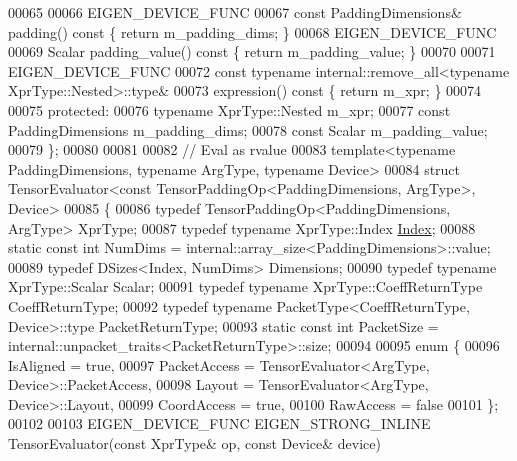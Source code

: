 \begin{DoxyCode}
00065 
00066     EIGEN\_DEVICE\_FUNC
00067     \textcolor{keyword}{const} PaddingDimensions& padding()\textcolor{keyword}{ const }\{ \textcolor{keywordflow}{return} m\_padding\_dims; \}
00068     EIGEN\_DEVICE\_FUNC
00069     Scalar padding\_value()\textcolor{keyword}{ const }\{ \textcolor{keywordflow}{return} m\_padding\_value; \}
00070 
00071     EIGEN\_DEVICE\_FUNC
00072     \textcolor{keyword}{const} \textcolor{keyword}{typename} internal::remove\_all<typename XprType::Nested>::type&
00073     expression()\textcolor{keyword}{ const }\{ \textcolor{keywordflow}{return} m\_xpr; \}
00074 
00075   \textcolor{keyword}{protected}:
00076     \textcolor{keyword}{typename} XprType::Nested m\_xpr;
00077     \textcolor{keyword}{const} PaddingDimensions m\_padding\_dims;
00078     \textcolor{keyword}{const} Scalar m\_padding\_value;
00079 \};
00080 
00081 
00082 \textcolor{comment}{// Eval as rvalue}
00083 \textcolor{keyword}{template}<\textcolor{keyword}{typename} PaddingDimensions, \textcolor{keyword}{typename} ArgType, \textcolor{keyword}{typename} Device>
00084 \textcolor{keyword}{struct }TensorEvaluator<const TensorPaddingOp<PaddingDimensions, ArgType>, Device>
00085 \{
00086   \textcolor{keyword}{typedef} TensorPaddingOp<PaddingDimensions, ArgType> XprType;
00087   \textcolor{keyword}{typedef} \textcolor{keyword}{typename} XprType::Index \hyperlink{namespace_eigen_a62e77e0933482dafde8fe197d9a2cfde}{Index};
00088   \textcolor{keyword}{static} \textcolor{keyword}{const} \textcolor{keywordtype}{int} NumDims = internal::array\_size<PaddingDimensions>::value;
00089   \textcolor{keyword}{typedef} DSizes<Index, NumDims> Dimensions;
00090   \textcolor{keyword}{typedef} \textcolor{keyword}{typename} XprType::Scalar Scalar;
00091   \textcolor{keyword}{typedef} \textcolor{keyword}{typename} XprType::CoeffReturnType CoeffReturnType;
00092   \textcolor{keyword}{typedef} \textcolor{keyword}{typename} PacketType<CoeffReturnType, Device>::type PacketReturnType;
00093   \textcolor{keyword}{static} \textcolor{keyword}{const} \textcolor{keywordtype}{int} PacketSize = internal::unpacket\_traits<PacketReturnType>::size;
00094 
00095   \textcolor{keyword}{enum} \{
00096     IsAligned = \textcolor{keyword}{true},
00097     PacketAccess = TensorEvaluator<ArgType, Device>::PacketAccess,
00098     Layout = TensorEvaluator<ArgType, Device>::Layout,
00099     CoordAccess = \textcolor{keyword}{true},
00100     RawAccess = \textcolor{keyword}{false}
00101   \};
00102 
00103   EIGEN\_DEVICE\_FUNC EIGEN\_STRONG\_INLINE TensorEvaluator(\textcolor{keyword}{const} XprType& op, \textcolor{keyword}{const} Device& device)

\end{DoxyCode}

